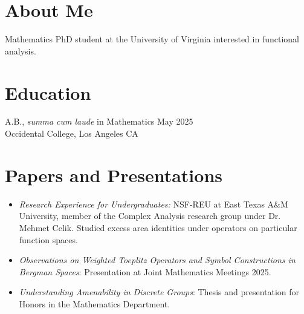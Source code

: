 \documentclass[margin, 12pt]{res} %
\begin{document}
\begin{resume}

\section{\sc About Me}
Mathematics PhD student at the University of Virginia interested in functional analysis.

\section{\sc Education}

A.B., \textsl{summa cum laude} in Mathematics \hfill May 2025 \\
Occidental College, Los Angeles CA
\section{\sc Papers and Presentations}
\begin{itemize}
  \item {\sl Research Experience for Undergraduates:} NSF-REU at East Texas A\&M University, member of the Complex Analysis research group under Dr. Mehmet Celik. Studied excess area identities under operators on particular function spaces.
  \item {\sl Observations on Weighted Toeplitz Operators and Symbol Constructions in Bergman Spaces}: Presentation at Joint Mathematics Meetings 2025.
  \item {\sl Understanding Amenability in Discrete Groups}: Thesis and presentation for Honors in the Mathematics Department.
\end{itemize}

\end{resume}
\end{document}
